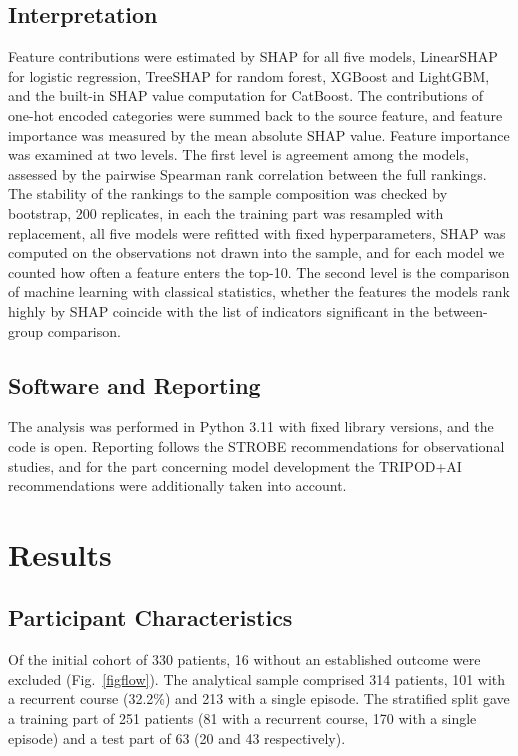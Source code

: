\documentclass[pdflatex,sn-basic,Numbered]{sn-jnl}
\begin{document}
\subsection{Interpretation}\label{subsec2_10}

Feature contributions were estimated by SHAP for all five models, LinearSHAP for logistic regression, TreeSHAP for random forest, XGBoost and LightGBM, and the built-in SHAP value computation for CatBoost. The contributions of one-hot encoded categories were summed back to the source feature, and feature importance was measured by the mean absolute SHAP value. Feature importance was examined at two levels. The first level is agreement among the models, assessed by the pairwise Spearman rank correlation between the full rankings. The stability of the rankings to the sample composition was checked by bootstrap, 200 replicates, in each the training part was resampled with replacement, all five models were refitted with fixed hyperparameters, SHAP was computed on the observations not drawn into the sample, and for each model we counted how often a feature enters the top-10. The second level is the comparison of machine learning with classical statistics, whether the features the models rank highly by SHAP coincide with the list of indicators significant in the between-group comparison.

\subsection{Software and Reporting}\label{subsec2_11}

The analysis was performed in Python 3.11 with fixed library versions, and the code is open. Reporting follows the STROBE recommendations for observational studies, and for the part concerning model development the TRIPOD+AI recommendations were additionally taken into account.

\section{Results}\label{sec3}

\subsection{Participant Characteristics}\label{subsec3_1}

Of the initial cohort of 330 patients, 16 without an established outcome were excluded (Fig.~\ref{figflow}). The analytical sample comprised 314 patients, 101 with a recurrent course (32.2\%) and 213 with a single episode. The stratified split gave a training part of 251 patients (81 with a recurrent course, 170 with a single episode) and a test part of 63 (20 and 43 respectively).
\end{document}
